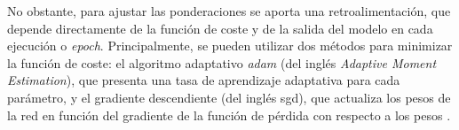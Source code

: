 \vspace{3mm}

No obstante, para ajustar las ponderaciones se aporta una retroalimentación, que depende directamente de la función de coste y de la salida del modelo en cada ejecución o \textit{epoch}. Principalmente, se pueden utilizar dos métodos para minimizar la función de coste: el algoritmo adaptativo \textit{adam} (del inglés \textit{Adaptive Moment Estimation}), que presenta una tasa de aprendizaje adaptativa para cada parámetro, y el gradiente descendiente (del inglés \gls{sgd}), que actualiza los pesos de la red en función del gradiente de la función de pérdida con respecto a los pesos \cite{ibmann}.

\pagebreak